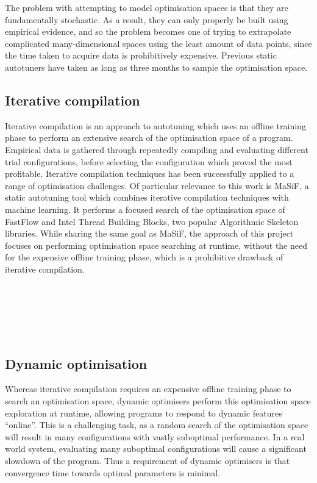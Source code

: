 The problem with attempting to model optimisation spaces is that they
are fundamentally stochastic. As a result, they can only properly be
built using empirical evidence, and so the problem becomes one of
trying to extrapolate complicated many-dimensional spaces using the
least amount of data points, since the time taken to acquire data is
prohibitively expensive. Previous static autotuners have taken as long
as three months to sample the optimisation space.

\subsection{Iterative compilation}
Iterative compilation is an approach to autotuning which uses an
offline training phase to perform an extensive search of the
optimisation space of a program.  Empirical data is gathered through
repeatedly compiling and evaluating different trial configurations,
before selecting the configuration which proved the most
profitable. Iterative compilation techniques has been successfully
applied to a range of optimisation challenges. Of particular relevance
to this work is MaSiF, a static autotuning tool which combines
iterative compilation techniques with machine learning.  It performs a
focused search of the optimisation space of FastFlow and Intel Thread
Building Blocks, two popular Algorithmic Skeleton libraries. While
sharing the same goal as MaSiF, the approach of this project focuses
on performing optimisation space searching at runtime, without the
need for the expensive offline training phase, which is a prohibitive
drawback of iterative compilation.

~\cite{Fursin2010}

~\cite{Auler2014}

~\cite{Agakov}

\subsection{Dynamic optimisation}
Whereas iterative compilation requires an expensive offline training
phase to search an optimisation space, dynamic optimisers perform this
optimisation space exploration at runtime, allowing programs to
respond to dynamic features ``online''. This is a challenging task, as
a random search of the optimisation space will result in many
configurations with vastly suboptimal performance. In a real world
system, evaluating many suboptimal configurations will cause a
significant slowdown of the program. Thus a requirement of dynamic
optimisers is that convergence time towards optimal parameters is
minimal.

